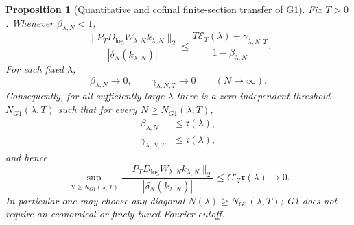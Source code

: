 \documentclass[11pt]{article}
\newtheorem{proposition}[theorem]{Proposition}
\theoremstyle{remark}
\begin{document}
\begin{proposition}[Quantitative and cofinal finite-section transfer of G1]\label{prop:finite-g1-transfer}
Fix $T>0$.  Whenever $\beta_{\lambda,N}<1$,
\begin{equation}\label{eq:g1-master-bound}
 \boxed{
 \frac{\|P_TD_{\log}W_{\lambda,N}k_{\lambda,N}\|_2}
 {|\delta_N(k_{\lambda,N})|}
 \le
 \frac{T\mathcal E_T(\lambda)+\gamma_{\lambda,N,T}}
 {1-\beta_{\lambda,N}}.}
\end{equation}
For each fixed $\lambda$,
\begin{equation}\label{eq:g1-defects-fixed-lambda}
 \beta_{\lambda,N}\longrightarrow0,
 \qquad
 \gamma_{\lambda,N,T}\longrightarrow0
 \qquad(N\to\infty).
\end{equation}
Consequently, for all sufficiently large $\lambda$ there is a zero-independent
threshold $N_{G1}(\lambda,T)$ such that for \emph{every}
$N\ge N_{G1}(\lambda,T)$,
\begin{align}
 \beta_{\lambda,N}&\le\mathfrak r(\lambda),
 \label{eq:g1-threshold-beta}\\
 \gamma_{\lambda,N,T}&\le\mathfrak r(\lambda),
 \label{eq:g1-threshold-gamma}
\end{align}
and hence
\begin{equation}\label{eq:finite-g1-transfer}
 \boxed{
 \sup_{N\ge N_{G1}(\lambda,T)}
 \frac{\|P_TD_{\log}W_{\lambda,N}k_{\lambda,N}\|_2}
 {|\delta_N(k_{\lambda,N})|}
 \le C'_T\mathfrak r(\lambda)\longrightarrow0.}
\end{equation}
In particular one may choose any diagonal $N(\lambda)\ge N_{G1}(\lambda,T)$;
G1 does not require an economical or finely tuned Fourier cutoff.
\end{proposition}
\end{document}
